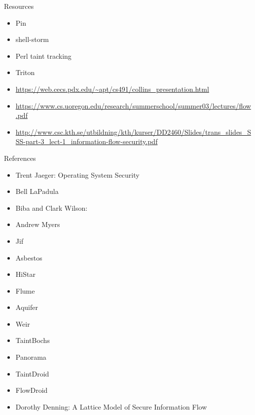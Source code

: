 \documentclass{curs}
\begin{document}
\begin{frame}{Resources}
  \begin{itemize}
    \item Pin
    \item shell-storm
    \item Perl taint tracking
    \item Triton
    \item \url{https://web.cecs.pdx.edu/~apt/cs491/collins_presentation.html}
    \item \url{https://www.cs.uoregon.edu/research/summerschool/summer03/lectures/flow.pdf}
    \item \url{http://www.csc.kth.se/utbildning/kth/kurser/DD2460/Slides/trans_slides_SSS-part-3_lect-1_information-flow-security.pdf}
  \end{itemize}
\end{frame}

\begin{frame}{References}
  \begin{itemize}
    \item Trent Jaeger: Operating System Security
    \item Bell LaPadula
    \item Biba and Clark Wilson:
    \item Andrew Myers
    \item Jif
    \item Asbestos
    \item HiStar
    \item Flume
    \item Aquifer
    \item Weir
    \item TaintBochs
    \item Panorama
    \item TaintDroid
    \item FlowDroid
    \item Dorothy Denning: A Lattice Model of Secure Information Flow
  \end{itemize}
\end{frame}
\end{document}

